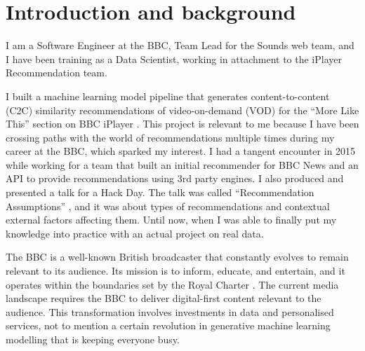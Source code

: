 
\section{Introduction and background}

I am a Software Engineer at the BBC, Team Lead for the Sounds web team, and I have been training as a Data Scientist,
working in attachment to the iPlayer Recommendation team.

I built a machine learning model pipeline that generates content-to-content (C2C) similarity recommendations
of video-on-demand (VOD) for the ``More Like This'' section on BBC iPlayer \cite{BBC:MoreLikeBluey}.
This project is relevant to me because I have been crossing paths with the world of recommendations
multiple times during my career at the BBC, which sparked my interest.
I had a tangent encounter in 2015 while working for a team that built
an initial recommender for BBC News and an API to provide recommendations using 3rd party engines.
I also produced and presented a talk for a Hack Day.
The talk was called ``Recommendation Assumptions'' \cite{RecsAssumptions},
and it was about types of recommendations and contextual external factors affecting them.
Until now, when I was able to finally put my knowledge into practice
with an actual project on real data.

The BBC is a well-known British broadcaster that constantly evolves to remain relevant to its audience.
Its mission is to inform, educate, and entertain, and it operates within the boundaries set by the Royal Charter \cite{BBC:RoyalCharter}.
The current media landscape requires the BBC to deliver digital-first content relevant to the audience.
This transformation involves investments in data and personalised services,
not to mention a certain revolution in generative machine learning modelling that is keeping everyone busy.
